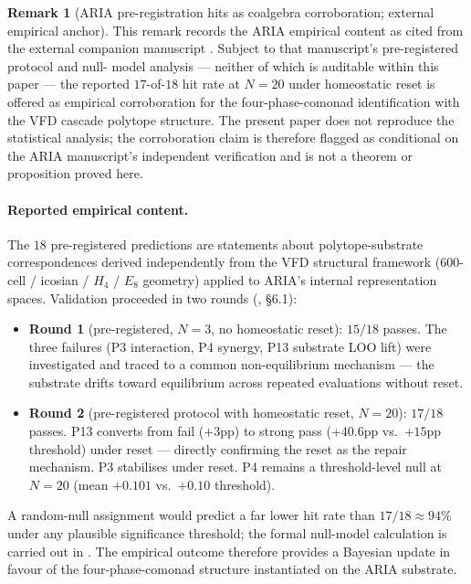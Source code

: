 \documentclass[11pt, a4paper]{amsart}
\theoremstyle{definition}
\newtheorem{remark}[theorem]{Remark}
\begin{document}
\begin{remark}[ARIA pre-registration hits as coalgebra
  corroboration; external empirical anchor]
\label{prop:aria-hits}
This remark records the ARIA empirical content as cited from
the external companion manuscript \cite{AriaBrainMapping}.
Subject to that manuscript's pre-registered protocol and null-
model analysis — neither of which is auditable within this
paper — the reported $17$-of-$18$ hit rate at $N{=}20$ under
homeostatic reset is offered as empirical corroboration for
the four-phase-comonad identification with the VFD cascade
polytope structure. The present paper does not reproduce the
statistical analysis; the corroboration claim is therefore
flagged as conditional on the ARIA manuscript's independent
verification and is not a theorem or proposition proved here.

\paragraph{Reported empirical content.}
The $18$ pre-registered predictions are statements about
polytope-substrate correspondences derived independently from
the VFD structural framework ($600$-cell / icosian / $H_4$ /
$E_8$ geometry) applied to ARIA's internal representation
spaces. Validation proceeded in two rounds
(\cite{AriaBrainMapping}, \S 6.1):
\begin{itemize}
\item \textbf{Round 1} (pre-registered, $N{=}3$, no homeostatic
  reset): $15/18$ passes. The three failures (P3 interaction,
  P4 synergy, P13 substrate LOO lift) were investigated and
  traced to a common non-equilibrium mechanism — the substrate
  drifts toward equilibrium across repeated evaluations without
  reset.
\item \textbf{Round 2} (pre-registered protocol with homeostatic
  reset, $N{=}20$): $17/18$ passes. P13 converts from fail
  ($+3$pp) to strong pass ($+40.6$pp vs.~$+15$pp threshold)
  under reset — directly confirming the reset as the repair
  mechanism. P3 stabilises under reset. P4 remains a
  threshold-level null at $N{=}20$ (mean $+0.101$ vs.~$+0.10$
  threshold).
\end{itemize}
A random-null assignment would predict a far lower hit rate
than $17/18 \approx 94\%$ under any plausible significance
threshold; the formal null-model calculation is carried out
in \cite{AriaBrainMapping}. The empirical outcome therefore
provides a Bayesian update in favour of the four-phase-comonad
structure instantiated on the ARIA substrate.


\end{remark}
\end{document}
